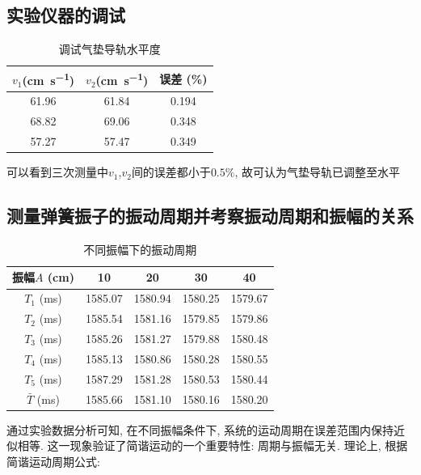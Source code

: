\documentclass[zihao=5, UTF8]{article}
\theoremstyle{MyLineTheoremStyle} %
\theoremstyle{MyBlockTheoremStyle} %
\theoremstyle{MySubsubsectionStyle} %
\begin{document}
\subsection{实验仪器的调试}
\begin{table}[H]
    \centering
    \begin{tabular}{|c|c|c|} 
    \hline
    $v_1$(\si{\centi\metre\per\second}) & $v_2$(\si{\centi\metre\per\second})  & 误差 (\%)     \\ 
    \hline
    61.96  & 61.84  & 0.194  \\ 
    \hline
    68.82  & 69.06  & 0.348  \\ 
    \hline
    57.27  & 57.47  & 0.349  \\
    \hline
    \end{tabular}
    \caption{调试气垫导轨水平度}
\end{table}

可以看到三次测量中$v_1$,$v_2$间的误差都小于$0.5\%$, 故可认为气垫导轨已调整至水平

\subsection{测量弹簧振子的振动周期并考察振动周期和振幅的关系}
\begin{table}[H]
\centering
\begin{tabular}{|c|c|c|c|c|} 
\hline
振幅$A$ (\si{\centi\metre})     & 10      & 20      & 30      & 40       \\ 
\hline
$T_1$ (\si{\milli\second})      & 1585.07 & 1580.94 & 1580.25 & 1579.67  \\ 
\hline
$T_2$ (\si{\milli\second})     & 1585.54 & 1581.16 & 1579.85 & 1579.86  \\ 
\hline
$T_3$ (\si{\milli\second})      & 1585.26 & 1581.27 & 1579.88 & 1580.48  \\ 
\hline
$T_4$ (\si{\milli\second})      & 1585.13 & 1580.86 & 1580.28 & 1580.55  \\ 
\hline
$T_5$ (\si{\milli\second})      & 1587.29 & 1581.28 & 1580.53 & 1580.44  \\ 
\hline
$\bar{T}$ (\si{\milli\second}) & 1585.66 & 1581.10 & 1580.16 & 1580.20  \\
\hline
\end{tabular}
\caption{不同振幅下的振动周期}
\end{table}

通过实验数据分析可知, 在不同振幅条件下, 系统的运动周期在误差范围内保持近似相等. 这一现象验证了简谐运动的一个重要特性: 周期与振幅无关. 理论上, 根据简谐运动周期公式: 
\end{document}
